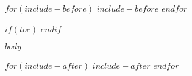 \documentclass[10pt]{article}
\begin{document}
$for(include-before)$
$include-before$
$endfor$

$if(toc)$
{
  \setcounter{tocdepth}{$toc-depth$}
  \tableofcontents
  \clearpage
}
$endif$

$body$

$for(include-after)$
$include-after$
$endfor$
\end{document}
